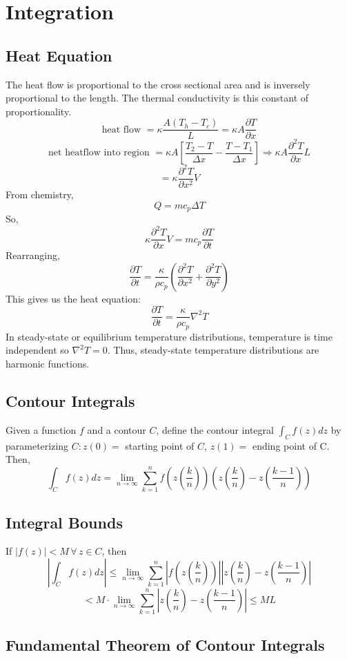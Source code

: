 \documentclass[../main.tex]{subfiles}
\begin{document}
\chapter{Integration}
\section{Heat Equation}
The heat flow is proportional to the cross sectional area and is inversely 
proportional to the length. The thermal conductivity is this constant of proportionality.
$$\text{heat flow }=\kappa\frac{A(T_{h}-T_{c})}{L}=\kappa A\frac{\partial T}{\partial x}$$
$$\text{net heatflow into region }=\kappa A\left[\frac{T_{2}-T}{\Delta x}-\frac{T-T_{1}}{\Delta x}\right]\Rightarrow\kappa A\frac{\partial^{2}T}{\partial x}L$$
$$=\kappa\frac{\partial^{2}T}{\partial x^{2}} V$$
From chemistry,
$$Q=mc_{p}\Delta T$$
So,
$$\kappa\frac{\partial^{2}T}{\partial x} V=mc_{p}\frac{\partial T}{\partial t}$$
Rearranging,
$$\frac{\partial T}{\partial t}=\frac{\kappa}{\rho c_{p}}\left(\frac{\partial^{2}T}{\partial x^{2}}+\frac{\partial^{2}T}{\partial y^{2}}\right)$$
This gives us the heat equation:
$$\boxed{\frac{\partial T}{\partial t}=\frac{\kappa}{\rho c_{p}}\nabla^{2}T}$$
In steady-state or equilibrium temperature distributions, temperature is time independent so $\nabla^{2}T=0$. 
Thus, steady-state temperature distributions are harmonic functions.

\section{Contour Integrals}
Given a function $f$ and a contour $C$, define the contour integral $\int_{C}f(z)dz$ by parameterizing
$C:z(0)=$ starting point of $C$, $z(1)=$ ending point of C. Then,
$$\int_{C}f(z)dz=\lim_{n\rightarrow\infty}\sum_{k=1}^{n}f\left(z\left(\frac{k}{n}\right)\right)\left(z\left(\frac{k}{n}\right)-z\left(\frac{k-1}{n}\right)\right)$$

\section{Integral Bounds}
If $|f(z)|<M\,\forall\, z\in C$, then
$$|\int_{C}f(z)dz|\leq \lim_{n\rightarrow\infty}\sum_{k=1}^{n}\left|f\left(z\left(\frac{k}{n}\right)\right)\right|\left|z\left(\frac{k}{n}\right)-z\left(\frac{k-1}{n}\right)\right|$$
$$<M\cdot\lim_{n\rightarrow\infty}\sum_{k=1}^{n}\left|z\left(\frac{k}{n}\right)-z\left(\frac{k-1}{n}\right)\right|\leq ML$$

\section{Fundamental Theorem of Contour Integrals}
\end{document}
